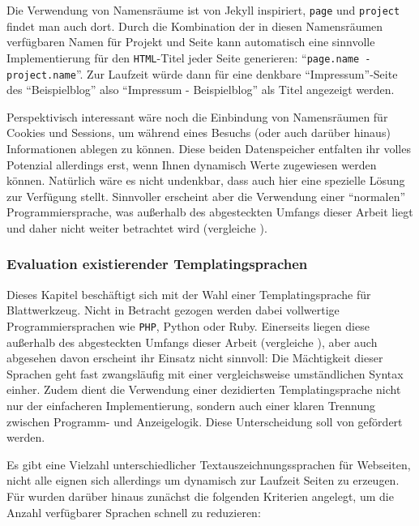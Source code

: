 Die Verwendung von Namensräume ist von Jekyll inspiriert, \texttt{page} und \texttt{project} findet man auch dort. Durch die Kombination der in diesen Namensräumen verfügbaren Namen für Projekt und Seite kann \idename{} automatisch eine sinnvolle Implementierung für den \texttt{HTML}-Titel jeder Seite generieren: "`\texttt{page.name - project.name}"'. Zur Laufzeit würde dann für eine denkbare "`Impressum"'-Seite des "`Beispielblog"' also "`Impressum - Beispielblog"' als Titel angezeigt werden.

Perspektivisch interessant wäre noch die Einbindung von Namensräumen für Cookies und Sessions, um während eines Besuchs (oder auch darüber hinaus) Informationen ablegen zu können. Diese beiden Datenspeicher entfalten ihr volles Potenzial allerdings erst, wenn Ihnen dynamisch Werte zugewiesen werden können. Natürlich wäre es nicht undenkbar, dass \idename{} auch hier eine spezielle Lösung zur Verfügung stellt. Sinnvoller erscheint aber die Verwendung einer "`normalen"' Programmiersprache, was außerhalb des abgesteckten Umfangs dieser Arbeit liegt und daher nicht weiter betrachtet wird (vergleiche ).

\subsubsection{Evaluation existierender Templatingsprachen}

Dieses Kapitel beschäftigt sich mit der Wahl einer Templatingsprache für Blattwerkzeug. Nicht in Betracht gezogen werden dabei vollwertige Programmiersprachen wie \texttt{PHP}, Python oder Ruby. Einerseits liegen diese außerhalb des abgesteckten Umfangs dieser Arbeit (vergleiche ), aber auch abgesehen davon erscheint ihr Einsatz nicht sinnvoll: Die Mächtigkeit dieser Sprachen geht fast zwangsläufig mit einer vergleichsweise umständlichen Syntax einher. Zudem dient die Verwendung einer dezidierten Templatingsprache nicht nur der einfacheren Implementierung, sondern auch einer klaren Trennung zwischen Programm- und Anzeigelogik. Diese Unterscheidung soll von \idename{} gefördert werden.

Es gibt eine Vielzahl unterschiedlicher Textauszeichnungssprachen für Webseiten, nicht alle eignen sich allerdings um dynamisch zur Laufzeit Seiten zu erzeugen. Für \idename{} wurden darüber hinaus zunächst die folgenden Kriterien angelegt, um die Anzahl verfügbarer Sprachen schnell zu reduzieren:

